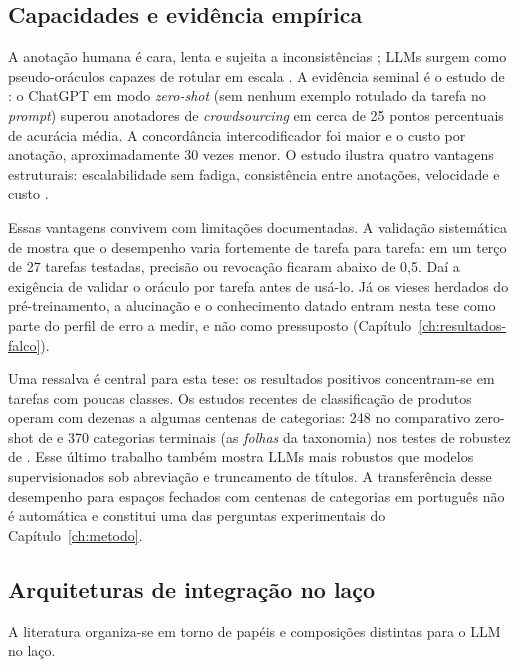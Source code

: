 \subsection{Capacidades e evidência empírica}
\label{sssec:llm_substituto}

A anotação humana é cara, lenta e sujeita a inconsistências
\cite{Settles2012}; LLMs surgem como pseudo-oráculos capazes de rotular em
escala \citep{zhang-etal-2022-survey}. A evidência seminal é o estudo de
\citet{Gilardi2023}: o ChatGPT em modo \textit{zero-shot} (sem nenhum exemplo
rotulado da tarefa no \textit{prompt}) superou anotadores
de \textit{crowdsourcing} em cerca de 25 pontos percentuais de acurácia
média. A concordância intercodificador foi maior e o custo por anotação,
aproximadamente 30 vezes menor. O estudo ilustra quatro vantagens estruturais: escalabilidade
sem fadiga, consistência entre anotações, velocidade e custo
\citep{Gilardi2023}.

Essas vantagens convivem com limitações documentadas. A validação sistemática
de \citet{Pangakis2023Validation} mostra que o desempenho varia fortemente de
tarefa para tarefa: em um terço de 27 tarefas testadas, precisão ou revocação ficaram
abaixo de 0,5. Daí a exigência de validar o oráculo por tarefa antes de
usá-lo. Já os vieses herdados do pré-treinamento, a alucinação e o
conhecimento datado entram nesta tese como parte do perfil de erro a medir, e
não como pressuposto (Capítulo~\ref{ch:resultados-falco}).

Uma ressalva é central para esta tese: os resultados positivos
concentram-se em tarefas com poucas classes. Os estudos recentes de
classificação de produtos operam com dezenas a algumas centenas de
categorias: 248 no comparativo zero-shot de \citet{Roumeliotis2025} e 370
categorias terminais (as \emph{folhas} da taxonomia) nos testes de robustez
de \citet{Gholamian2024}. Esse último trabalho também mostra LLMs mais
robustos que modelos supervisionados sob abreviação e truncamento de
títulos. A transferência
desse desempenho para espaços fechados com centenas de categorias em
português não é automática e constitui uma das perguntas experimentais do
Capítulo~\ref{ch:metodo}.

\subsection{Arquiteturas de integração no laço}
\label{sssec:llm_seletor}

A literatura organiza-se em torno de papéis e composições distintas para o
LLM no laço.


